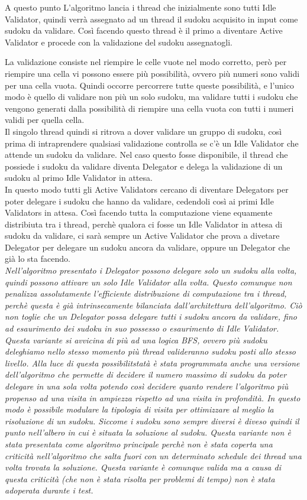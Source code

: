 \documentclass[twoside,twocolumn]{article}
\begin{document}
A questo punto L'algoritmo lancia i thread che inizialmente sono tutti Idle Validator, quindi verrà assegnato ad un thread il sudoku acquisito in input come sudoku da validare. Così facendo questo thread è il primo a diventare Active Validator e procede con la validazione del sudoku assegnatogli. 

La validazione consiste nel riempire le celle vuote nel modo corretto, però per riempire una cella vi possono essere più possibilità, ovvero più numeri sono validi per una cella vuota. Quindi occorre percorrere tutte queste possibilità, e l'unico modo è quello di validare non più un solo sudoku, ma validare tutti i sudoku che vengono generati dalla possibilità di riempire una cella vuota con tutti i numeri validi per quella cella.
\\\indent
Il singolo thread quindi si ritrova a dover validare un gruppo di sudoku, così prima di intraprendere qualsiasi validazione controlla se c'è un Idle Validator che attende un sudoku da validare. Nel caso questo fosse disponibile, il thread che possiede i sudoku da validare diventa Delegator e delega la validazione di un sudoku al primo Idle Validator in attesa.
\\\indent
In questo modo tutti gli Active Validators cercano di diventare Delegators per poter delegare i sudoku che hanno da validare, cedendoli così ai primi Idle Validators in attesa. Così facendo tutta la computazione viene equamente distribiuta tra i thread, perchè qualora ci fosse un Idle Validator in attesa di sudoku da validare, ci sarà sempre un Active Validator che prova a divetare Delegator per delegare un sudoku ancora da validare, oppure un Delegator che già lo sta facendo.
\\\indent
{\itshape Nell'algoritmo presentato i Delegator possono delegare solo un sudoku alla volta, quindi possono attivare un solo Idle Validator alla volta. Questo comunque non penalizza assolutamente l'efficiente distribuzione di computazione tra i thread, perchè questa è già intrinsecamente bilanciata dall'architettura dell'algoritmo. Ciò non toglie che un Delegator possa delegare tutti i sudoku ancora da validare, fino ad esaurimento dei sudoku in suo possesso o esaurimento di Idle Validator. Questa variante si avvicina di più ad una logica BFS, ovvero più sudoku deleghiamo nello stesso momento più thread valideranno sudoku posti allo stesso livello. Alla luce di questa possibilitstatà è stata programmata anche una versione dell'algoritmo che permette di decidere il numero massimo di sudoku da poter delegare in una sola volta potendo così decidere quanto rendere l'algoritmo più propenso ad una visita in ampiezza rispetto ad una visita in profondità. In questo modo è possibile modulare la tipologia di visita per ottimizzare al meglio la risoluzione di un sudoku. Siccome i sudoku sono sempre diversi è diveso quindi il punto nell'albero in cui è situata la soluzione al sudoku. Questa variante non è stata presentata come algoritmo principale perchè non è stata coperta una criticità nell'algoritmo che salta fuori con un determinato schedule dei thread una volta trovata la soluzione. Questa variante è comunque valida ma a causa di questa criticità (che non è stata risolta per problemi di tempo) non è stata adoperata durante i test.}
\end{document}
